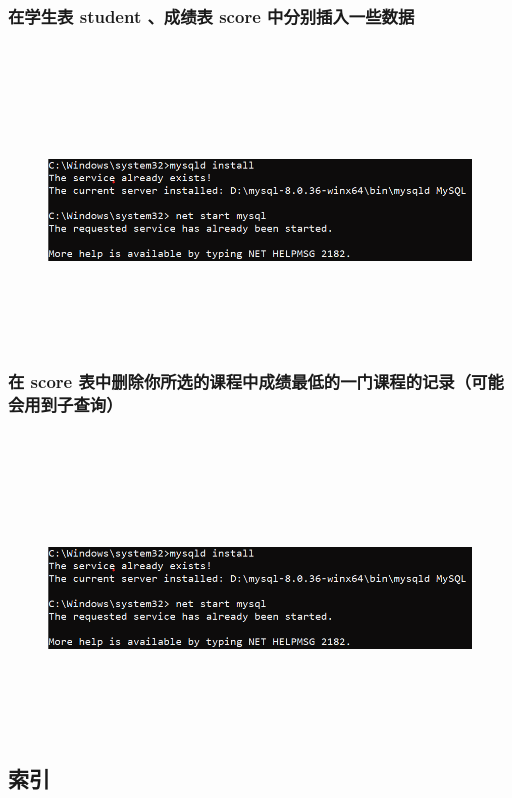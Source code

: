 \documentclass{ctexart}
\begin{document}
\subsubsection{在学生表 student 、成绩表 score 中分别插入一些数据}
\begin{lstlisting}[language=sql]
	
\end{lstlisting}
\begin{figure}[H]
	\centering 
	\includegraphics[height=7cm,width=14cm]{1.png}
	\end{figure}
\subsubsection{在 score 表中删除你所选的课程中成绩最低的一门课程的记录（可能会用到子查询）}
\begin{lstlisting}[language=sql]
	
\end{lstlisting}
\begin{figure}[H]
	\centering 
	\includegraphics[height=7cm,width=14cm]{1.png}
	\end{figure}
\subsection{索引}
\end{document}
